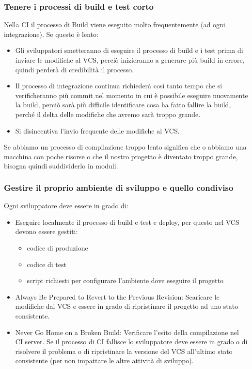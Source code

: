 \documentclass[10pt, a4paper]{article}
\begin{document}
\subsubsection*{Tenere i processi di build e test corto}
Nella CI il processo di Build viene eseguito molto frequentemente (ad ogni integrazione). Se questo è lento:
\begin{itemize}
    \item Gli sviluppatori smetteranno di eseguire il processo di build e i test prima di inviare le modifiche al VCS, perciò inizieranno a generare più build in errore, quindi perderà di credibilità il processo.
    \item  Il processo di integrazione continua richiederà così tanto tempo che si verificheranno più commit nel momento in cui è possibile eseguire nuovamente la build, perciò sarà più difficile identificare cosa ha fatto fallire la build, perché il delta delle modifiche che avremo sarà troppo grande.
    \item Si disincentiva l’invio frequente delle modifiche al VCS.
\end{itemize}
Se abbiamo un processo di compilazione troppo lento significa che o abbiamo una macchina con poche risorse o che il nostro progetto è diventato troppo grande, bisogna quindi suddividerlo in moduli.

\subsubsection*{Gestire il proprio ambiente di sviluppo e quello condiviso}
Ogni sviluppatore deve essere in grado di:
\begin{itemize}
    \item Eseguire localmente il processo di build e test e deploy, per questo nel VCS devono essere gestiti:
    \begin{itemize}
        \item codice di produzione
        \item codice di test
        \item script richiesti per configurare l’ambiente dove eseguire il progetto
    \end{itemize}
    \item Always Be Prepared to Revert to the Previous Revision: Scaricare le modifiche dal VCS e essere in grado di ripristinare il progetto ad uno stato consistente.
    \item Never Go Home on a Broken Build: Verificare l’esito della compilazione nel CI
server. Se il processo di CI fallisce lo sviluppatore deve essere in grado o di
risolvere il problema o di ripristinare la versione del VCS all’ultimo stato consistente (per non impattare le altre attività di sviluppo).
\end{itemize}
\end{document}
